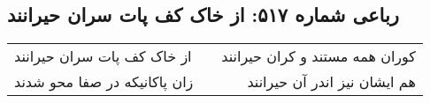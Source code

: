 \begin{center}
\section*{رباعی شماره ۵۱۷: از خاک کف پات سران حیرانند}
\label{sec:0517}
\begin{longtable}{l p{0.5cm} r}
از خاک کف پات سران حیرانند
&&
کوران همه مستند و کران حیرانند
\\
زان پاکانیکه در صفا محو شدند
&&
هم ایشان نیز اندر آن حیرانند
\\
\end{longtable}
\end{center}
